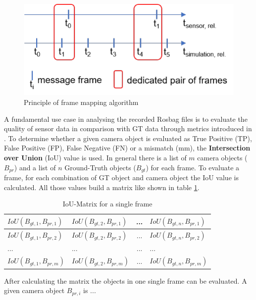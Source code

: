 \begin{figure}[thpb]
	\centering
	\includegraphics[width=\linewidth]{frame_mapping}
	\caption{Principle of frame mapping algorithm}
	\label{fig:frame_mapping}
\end{figure}

A fundamental use case in analysing the recorded Rosbag files is to evaluate the quality of sensor data in comparison with GT data through metrics introduced in \cite{Reway}. 
To determine whether a given camera object is evaluated as True Positive (TP), False Positive (FP), False Negative (FN) or a mismatch (mm), the \textbf{Intersection over Union} (IoU) value is used. 
In general there is a list of $m$ camera objects ($B_{pr}$) and a list of $n$ Ground-Truth objects ($B_{gt}$) for each frame. To evaluate a frame, for each combination of GT object and camera object the IoU value is calculated. All those values build a matrix like shown in table \ref{tab:matrix}.
\begin{table}[h]
	\caption{IoU-Matrix for a single frame}
	\begin{tabularx}{\columnwidth}{X|X|c|X}
		\toprule
		$IoU(B_{gt,1}, B_{pr,1})$ & $IoU(B_{gt,2}, B_{pr,1})$ & ... & $IoU(B_{gt,n}, B_{pr,1})$ \\
		\midrule
		$IoU(B_{gt,1}, B_{pr,2})$ & $IoU(B_{gt,2}, B_{pr,2})$ & ... & $IoU(B_{gt,n}, B_{pr,2})$ \\
		\midrule
		... & ... & ... & ... \\
		\midrule		
		$IoU(B_{gt,1}, B_{pr,m})$ & $IoU(B_{gt,2}, B_{pr,m})$ & ... & $IoU(B_{gt,n}, B_{pr,m})$ \\
		\bottomrule
	\end{tabularx}
	\label{tab:matrix}
\end{table}

After calculating the matrix the objects in one single frame can be evaluated. A given camera object $B_{pr,i}$ is ... \\

